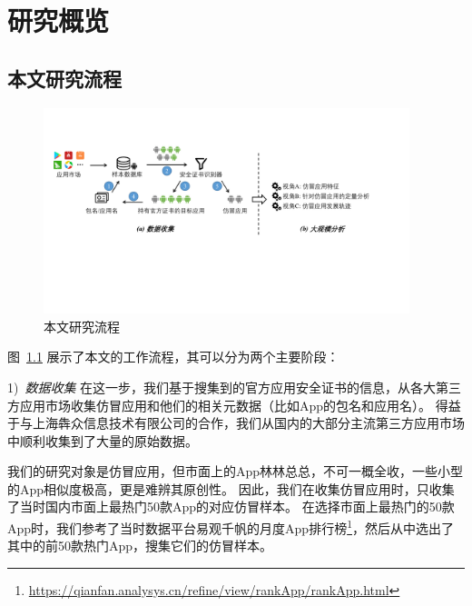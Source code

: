 \chapter{研究概览}
\label{chp:dataCollection}

\section{本文研究流程}

\begin{figure}[htbp]
	\centering
	\includegraphics[width=0.95\textwidth]{./Figures/overview_modified.pdf}
	\caption{本文研究流程}
	\label{fig:Workflow}
	\vspace{-3mm}
\end{figure}

图~\ref{fig:Workflow} 展示了本文的工作流程，其可以分为两个主要阶段：

1)\ \emph{数据收集} \quad
在这一步，我们基于搜集到的官方应用安全证书的信息，从各大第三方应用市场收集仿冒应用和他们的相关元数据（比如App的包名和应用名）。
得益于与上海犇众信息技术有限公司的合作，我们从国内的大部分主流第三方应用市场中顺利收集到了大量的原始数据。

我们的研究对象是仿冒应用，但市面上的App林林总总，不可一概全收，一些小型的App相似度极高，更是难辨其原创性。
因此，我们在收集仿冒应用时，只收集了当时国内市面上最热门50款App的对应仿冒样本。
在选择市面上最热门的50款App时，我们参考了当时数据平台易观千帆的月度App排行榜\footnote{\url{https://qianfan.analysys.cn/refine/view/rankApp/rankApp.html}}，然后从中选出了其中的前50款热门App，搜集它们的仿冒样本。

